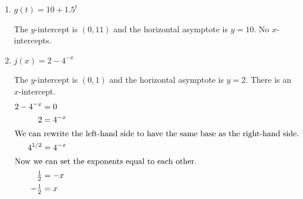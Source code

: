\documentclass{article}
\begin{document}
\begin{enumerate}[resume, topsep=0pt]
\begin{enumerate}
    \begin{solution}
    The $y$-intercept is $(0, -1.5)$ and the horizontal asymptote is $y=0$. No $x$-intercepts.
    
    \end{solution}

  \item
    \begin{problem}[\vfill]
      $g(t) = 10 + 1.5^t$
    \end{problem}

    \begin{solution}
    The $y$-intercept is $(0, 11)$ and the horizontal asymptote is $y=10$. No $x$-intercepts.
    
    \end{solution}

  \item
    \begin{problem}[\vfill]
      $j(x) = 2 - 4^{-x}$
    \end{problem}

    \begin{solution}
    The $y$-intercept is $(0, 1)$ and the horizontal asymptote is $y=2$. There
    is an $x$-intercept.
    \begin{align*}
     2-4^{-x} &= 0 \\
     2 &= 4^{-x} \\
     \intertext{We can rewrite the left-hand side to have
     the same base as the right-hand side.}
     4^{1/2} &= 4^{-x} \\
     \intertext{Now we can set the exponents equal to each other.}
     \tfrac{1}{2} &= -x \\
     -\tfrac{1}{2} &= x
    \end{align*}
    
    \end{solution}

  \end{enumerate}
\end{enumerate}
\end{document}

